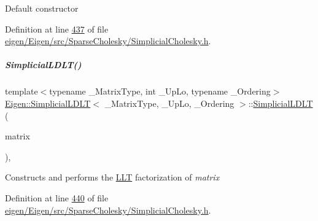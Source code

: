 Default constructor 

Definition at line \hyperlink{eigen_2_eigen_2src_2_sparse_cholesky_2_simplicial_cholesky_8h_source_l00437}{437} of file \hyperlink{eigen_2_eigen_2src_2_sparse_cholesky_2_simplicial_cholesky_8h_source}{eigen/\+Eigen/src/\+Sparse\+Cholesky/\+Simplicial\+Cholesky.\+h}.

\mbox{\label{group___sparse_cholesky___module_a07cb76aee396862f94c3eedc6d77d908}} 
\subparagraph{\texorpdfstring{Simplicial\+L\+D\+L\+T()}{SimplicialLDLT()}\hspace{0.1cm}{\footnotesize\ttfamily [2/4]}}
{\footnotesize\ttfamily template$<$typename \+\_\+\+Matrix\+Type, int \+\_\+\+Up\+Lo, typename \+\_\+\+Ordering$>$ \\
\hyperlink{group___sparse_cholesky___module_class_eigen_1_1_simplicial_l_d_l_t}{Eigen\+::\+Simplicial\+L\+D\+LT}$<$ \+\_\+\+Matrix\+Type, \+\_\+\+Up\+Lo, \+\_\+\+Ordering $>$\+::\hyperlink{group___sparse_cholesky___module_class_eigen_1_1_simplicial_l_d_l_t}{Simplicial\+L\+D\+LT} (\begin{DoxyParamCaption}\item[{const Matrix\+Type \&}]{matrix }\end{DoxyParamCaption})\hspace{0.3cm}{\ttfamily [inline]}, {\ttfamily [explicit]}}

Constructs and performs the \hyperlink{group___cholesky___module_class_eigen_1_1_l_l_t}{L\+LT} factorization of {\itshape matrix} 

Definition at line \hyperlink{eigen_2_eigen_2src_2_sparse_cholesky_2_simplicial_cholesky_8h_source_l00440}{440} of file \hyperlink{eigen_2_eigen_2src_2_sparse_cholesky_2_simplicial_cholesky_8h_source}{eigen/\+Eigen/src/\+Sparse\+Cholesky/\+Simplicial\+Cholesky.\+h}.

